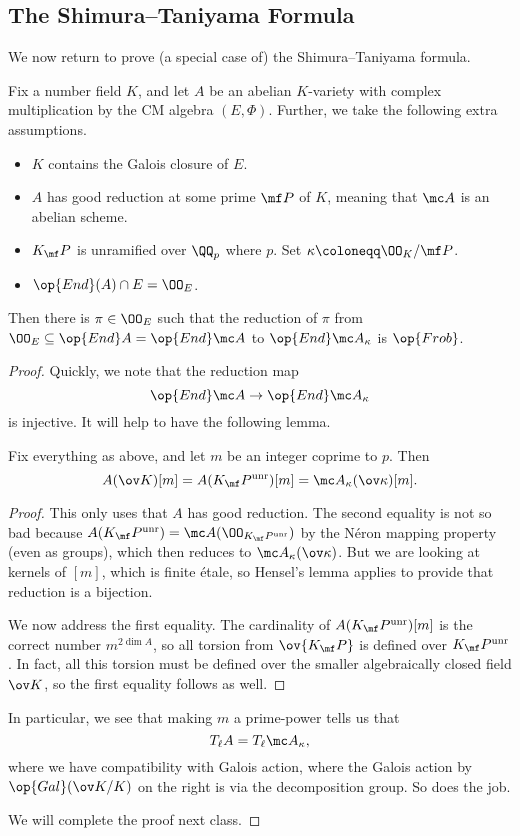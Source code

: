 \documentclass[../notes.tex]{subfiles}
\begin{document}
\subsection{The Shimura--Taniyama Formula}
We now return to prove (a special case of) the Shimura--Taniyama formula.
\begin{theorem}
	Fix a number field $K$, and let $A$ be an abelian $K$-variety with complex multiplication by the CM algebra $(E,\Phi)$. Further, we take the following extra assumptions.
	\begin{itemize}
		\item $K$ contains the Galois closure of $E$.
		\item $A$ has good reduction at some prime $\mf P$ of $K$, meaning that $\mc A$ is an abelian scheme.
		\item $K_\mf P$ is unramified over $\QQ_p$ where $p$. Set $\kappa\coloneqq\OO_K/\mf P$.
		\item $\op{End}(A)\cap E=\OO_E$.
	\end{itemize}
	Then there is $\pi\in\OO_E$ such that the reduction of $\pi$ from $\OO_E\subseteq\op{End}A=\op{End}\mc A$ to $\op{End}\mc A_\kappa$ is $\op{Frob}$.
\end{theorem}
\begin{proof}
	Quickly, we note that the reduction map
	\[\op{End}\mc A\to\op{End}\mc A_\kappa\]
	is injective. It will help to have the following lemma.
	\begin{lemma}
		Fix everything as above, and let $m$ be an integer coprime to $p$. Then
		\[A(\ov K)[m]=A(K_\mf P^{\mathrm{unr}})[m]=\mc A_\kappa(\ov\kappa)[m].\]
	\end{lemma}
	\begin{proof}
		This only uses that $A$ has good reduction. The second equality is not so bad because $A(K_\mf P^{\mathrm{unr}})=\mc A(\OO_{K_\mf P^{\mathrm{unr}}})$ by the N\'eron mapping property (even as groups), which then reduces to $\mc A_\kappa(\ov\kappa)$. But we are looking at kernels of $[m]$, which is finite \'etale, so Hensel's lemma applies to provide that reduction is a bijection.
		
		We now address the first equality. The cardinality of $A(K_\mf P^{\mathrm{unr}})[m]$ is the correct number $m^{2\dim A}$, so all torsion from $\ov{K_\mf P}$ is defined over $K_\mf P^{\mathrm{unr}}$. In fact, all this torsion must be defined over the smaller algebraically closed field $\ov K$, so the first equality follows as well.
	\end{proof}
	In particular, we see that making $m$ a prime-power tells us that
	\[T_\ell A=T_\ell\mc A_\kappa,\]
	where we have compatibility with Galois action, where the Galois action by $\op{Gal}(\ov K/K)$ on the right is via the decomposition group. So  does the job.

	We will complete the proof next class.
\end{proof}
\end{document}
